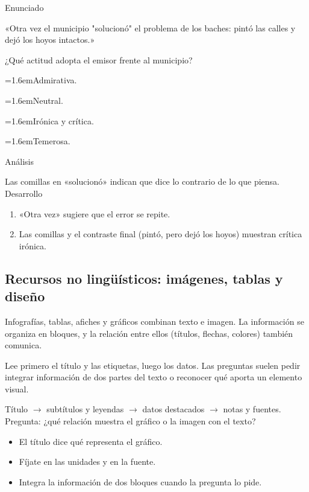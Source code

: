\documentclass[10pt,a4paper,twocolumn]{article}
\newcommand{\alternativa}[2]{\par\noindent\hangindent=1.6em\hangafter=1\makebox[1.6em][l]{\tecla{#1}}#2\par}
\newcommand{\clave}[1]{\par\smallskip{\sffamily\footnotesize\color{esmeralda} Clave \teclaok{#1}}\par}
\begin{document}
\begin{ejemplo}
{\sffamily\footnotesize\color{zinc500} Enunciado}\par
«Otra vez el municipio "solucionó" el problema de los baches: pintó las calles y dejó los hoyos intactos.»

¿Qué actitud adopta el emisor frente al municipio?
\alternativa{A}{Admirativa.}
\alternativa{B}{Neutral.}
\alternativa{C}{Irónica y crítica.}
\alternativa{D}{Temerosa.}
\clave{C}
{\sffamily\footnotesize\color{zinc500} Análisis}\par Las comillas en «solucionó» indican que dice lo contrario de lo que piensa.
{\sffamily\footnotesize\color{zinc500} Desarrollo}
\begin{enumerate}
  \item «Otra vez» sugiere que el error se repite.
  \item Las comillas y el contraste final (pintó, pero dejó los hoyos) muestran crítica irónica.
\end{enumerate}
\end{ejemplo}

\subsection{Recursos no lingüísticos: imágenes, tablas y diseño}

Infografías, tablas, afiches y gráficos combinan texto e imagen. La información se organiza en bloques, y la relación entre ellos (títulos, flechas, colores) también comunica.

Lee primero el título y las etiquetas, luego los datos. Las preguntas suelen pedir integrar información de dos partes del texto o reconocer qué aporta un elemento visual.

\begin{definicion}
Título $\rightarrow$ subtítulos y leyendas $\rightarrow$ datos destacados $\rightarrow$ notas y fuentes. Pregunta: ¿qué relación muestra el gráfico o la imagen con el texto?
\end{definicion}

\begin{ideasclave}
\begin{itemize}
  \item El título dice qué representa el gráfico.
  \item Fíjate en las unidades y en la fuente.
  \item Integra la información de dos bloques cuando la pregunta lo pide.
\end{itemize}
\end{ideasclave}
\end{document}
